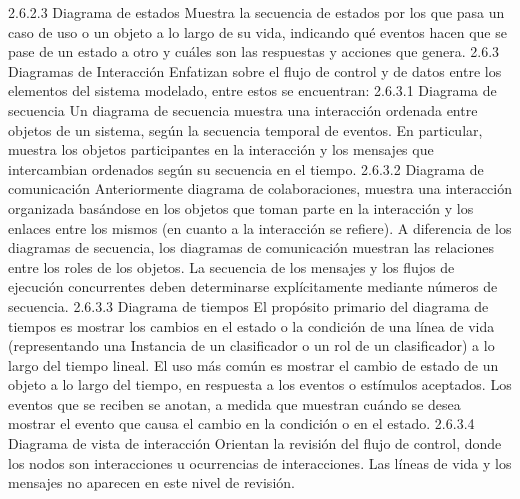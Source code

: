 2.6.2.3	Diagrama de estados 
Muestra la secuencia de estados por los que pasa un caso de uso o un objeto a lo largo de su vida, indicando qué eventos hacen que se pase de un estado a otro y cuáles son las respuestas y  acciones que genera.
2.6.3	Diagramas de Interacción
Enfatizan sobre el flujo de control y de datos entre los elementos del sistema modelado, entre estos se encuentran:
2.6.3.1	Diagrama de secuencia 
Un diagrama de secuencia muestra una interacción ordenada entre objetos de un sistema, según la secuencia temporal de eventos. En particular, muestra los objetos participantes en la interacción y los mensajes que intercambian ordenados según su secuencia en el tiempo.
2.6.3.2	Diagrama de comunicación 
Anteriormente diagrama de colaboraciones, muestra una interacción organizada basándose en los objetos que toman parte en la interacción y los enlaces entre los mismos (en cuanto a la interacción se refiere). A diferencia de los diagramas de secuencia, los diagramas de  comunicación muestran las relaciones entre los roles de los objetos. La secuencia de los mensajes y los flujos de ejecución concurrentes deben determinarse explícitamente mediante números de secuencia.
2.6.3.3	Diagrama de tiempos 
El propósito primario del diagrama de tiempos es mostrar los cambios en el estado o la condición de una línea de vida (representando una Instancia de un clasificador o un rol de un clasificador) a lo largo del tiempo lineal. El uso más común es mostrar el cambio de estado de un objeto a lo largo del tiempo, en respuesta a los eventos o estímulos aceptados. Los eventos que se reciben se anotan, a medida que muestran cuándo se desea mostrar el evento que causa el cambio en la condición o en el estado.
2.6.3.4	Diagrama de vista de interacción
Orientan la revisión del flujo de control, donde los nodos son interacciones u ocurrencias de interacciones. Las líneas de vida y los mensajes no aparecen en este nivel de revisión.
